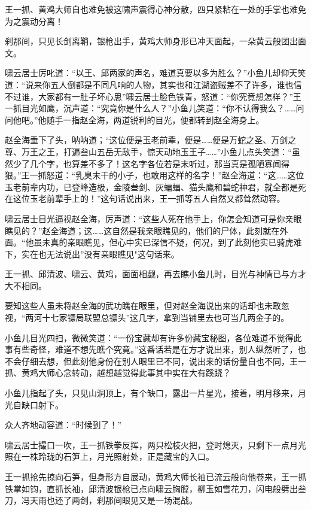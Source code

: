 \documentclass[12pt,oneside]{book}
\begin{document}
王一抓、黄鸡大师自也难免被这啸声震得心神分散，四只紧粘在一处的手掌也难免为之震动分离！

刹那间，只见长剑离鞘，银枪出手，黄鸡大师身形已冲天面起，一朵黄云般团出面文。

啸云居士厉叱道：``以王、邱两家的声名，难道真要以多为胜么？''小鱼儿却仰天笑道：``说来你五人倒都是不同凡响的人物，其实也和江湖盗贼差不了许多，谁也信不过谁，大家都有一肚子坏心思''啸云居士脸色铁青，怒道：``你究竟想怎样？''王一抓目光如鹰，沉声道：``究竟你是什么人？''小鱼儿笑道：``你不认得我么？\ldots\ldots 问问他吧。''他随手一指赵全海，两道锐利的目光，便都转到赵全海身上。

赵全海垂下了头，呐呐道；``这位便是玉老前辈，便是\ldots\ldots 便是万蛇之圣、万剑之尊、万王之王，打遍叁山五岳无敌手，惊天动地玉王子\ldots\ldots{}''小鱼儿点头笑道：``虽然少了几个字，也算差不多了！这名字各位若是末听过，那当真是孤陋寡闻得狠。''王一抓怒道：``乳臭末干的小子，也敢用这样的名字！''赵全海道：``这\ldots\ldots 这位玉老前辈内功，已登峰造极，金陵叁剑、灰蝙蝠、猫头鹰和碧蛇神君，就全都是死在这位玉老前辈手上的！''这句话说出来，王一抓等五人自然又都耸然动容。

啸云居士目光逼视赵全海，厉声道：``这些人死在他手上，你怎会知道可是你亲眼瞧见的？''赵全海道；这\ldots\ldots 这自然是我亲眼瞧见的，他们的尸体，此刻就在外面。``他虽未真的亲眼瞧见，但心中实已深信不疑，何况，到了此刻他实已骑虎难下，实在也无法说出''没有亲眼瞧见"这句话来。

王一抓、邱清波、啸云、黄鸡，面面相觑，再去瞧小鱼儿时，目光与神情已与方才大不相同。

要知这些人虽未将赵全海的武功瞧在眼里，但对赵全海说出来的话却也未敢忽视，``两河十七家镖局联盟总镖头''这几字，拿到当铺里去也可当几两金子的。

小鱼儿目光四扫，微微笑道：``一份宝藏却有许多份藏宝秘图，各位难道不觉得此事有些奇怪，难道不想先瞧个究竟。''这番话若是在方才说出来，别人纵然听了，也不会仔细去想，但此刻他身份在别人眼里已不同，说出来的话份量自也不同，王一抓、黄鸡大师心念转动，越想越觉得此事其中实在大有蹊跷？

小鱼儿指起了头，只见山洞顶上，有个缺口，露出一片星光，接着，明月移来，月光自缺口射下。

众人齐地动容道：``时候到了！''

啸云居士撮口一吹，王一抓铁拳反挥，两只松枝火把，登时熄灭，只剩下一点月光照在一株玲珑的石笋上，月光照射处，正是藏宝的入口。

王一抓抢先掠向石笋，但身形方自展动，黄鸡大师长袖已流云般向他卷来，王一抓铁掌如钧，直抓长袖，邱清波银枪已点向啸云胸膛，柳玉如雪花刀，闪电般劈出叁刀，冯天雨也还了两剑，刹那间眼见又是一场混战。
\end{document}
